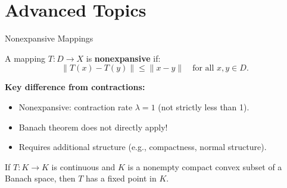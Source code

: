 \documentclass[aspectratio=169,10pt]{beamer}
\begin{document}
\section{Advanced Topics}

\begin{frame}{Nonexpansive Mappings}
  \begin{definition}
    A mapping $T: D \to X$ is \textbf{nonexpansive} if:
    \[
      \|T(x) - T(y)\| \leq \|x - y\|
      \quad \text{for all } x, y \in D.
    \]
  \end{definition}

  \vspace{0.4cm}

  \begin{remark}
    \textbf{Key difference from contractions:}
    \begin{itemize}
      \item Nonexpansive: contraction rate $\lambda = 1$ (not strictly less than 1).
      \item Banach theorem does not directly apply!
      \item Requires additional structure (e.g., compactness, normal structure).
    \end{itemize}
  \end{remark}

  \vspace{0.4cm}

  \begin{theorem}
    If $T: K \to K$ is continuous and $K$ is a nonempty compact convex subset
    of a Banach space, then $T$ has a fixed point in $K$.
  \end{theorem}
\end{frame}
\end{document}
